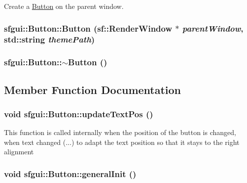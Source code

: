 Create a \hyperlink{classsfgui_1_1Button}{Button} on the parent window. \hypertarget{classsfgui_1_1Button_5189b70c8f868718f79c7e119e0b9b32}{
\subsubsection[Button]{\setlength{\rightskip}{0pt plus 5cm}sfgui::Button::Button (sf::RenderWindow $\ast$ {\em parentWindow}, \/  std::string {\em themePath})}}
\label{classsfgui_1_1Button_5189b70c8f868718f79c7e119e0b9b32}


\hypertarget{classsfgui_1_1Button_835b0cbc92ef98e4c884398e036d26ca}{
\subsubsection[$\sim$Button]{\setlength{\rightskip}{0pt plus 5cm}sfgui::Button::$\sim$Button ()}}
\label{classsfgui_1_1Button_835b0cbc92ef98e4c884398e036d26ca}




\subsection{Member Function Documentation}
\hypertarget{classsfgui_1_1Button_1e1eade317f3b603011067e4997b0725}{
\subsubsection[updateTextPos]{\setlength{\rightskip}{0pt plus 5cm}void sfgui::Button::updateTextPos ()}}
\label{classsfgui_1_1Button_1e1eade317f3b603011067e4997b0725}




This function is called internally when the position of the button is changed, when text changed (...) to adapt the text position so that it stays to the right alignment \hypertarget{classsfgui_1_1Button_59849e58ed4c46061d71f7172cab4e4e}{
\subsubsection[generalInit]{\setlength{\rightskip}{0pt plus 5cm}void sfgui::Button::generalInit ()}}
\label{classsfgui_1_1Button_59849e58ed4c46061d71f7172cab4e4e}




